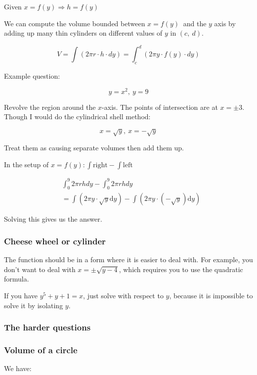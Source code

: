 \documentclass[12pt]{article}
\theoremstyle{plain}
\theoremstyle{remark}
\theoremstyle{definition}
\begin{document}
Given \(x = f(y) \Rightarrow h = f(y)\)

We can compute the volume bounded between \(x = f(y)\ \) and the \(y\)
axis by adding up many thin cylinders on different values of \(y\) in
\((c,\ d)\).

\[V = \int(2\pi r \cdot h \cdot dy) = \int_{c}^{d}\left( 2\pi y \cdot f(y) \cdot dy \right)\]

Example question:


\[y = x^{2},\ y = 9\]

Revolve the region around the \(x\)-axis. The points of intersection are
at \(x = \pm 3\). Though I would do the cylindrical shell method:

\[x = \sqrt{y},\ x = - \sqrt{y}\]

Treat them as causing separate volumes then add them up.

In the setup of \(x = f(y):\int\text{right} - \int\text{left\ }\)

\begin{align*}
&\int_{0}^{9}{2\pi rhdy} - \int_{0}^{9}{2\pi rhdy} \\
&= \int\left( 2\pi y \cdot \sqrt{y}\text{d}y \right) - \int\left( 2\pi y \cdot \left( - \sqrt{y} \right)\text{d}y \right)
\end{align*}


Solving this gives us the answer.


\subsubsection{Cheese wheel or
cylinder}

The function should be in a form where it is easier to deal with. For
example, you don't want to deal with \(x = \pm \sqrt{y - 4}\), which
requires you to use the quadratic formula.

If you have \(y^{5} + y + 1 = x\), just solve with respect to \(y\),
because it is impossible to solve it by isolating \(y\).


\subsubsection{The harder questions}



\subsubsection{Volume of a circle}

We have:
\end{document}
